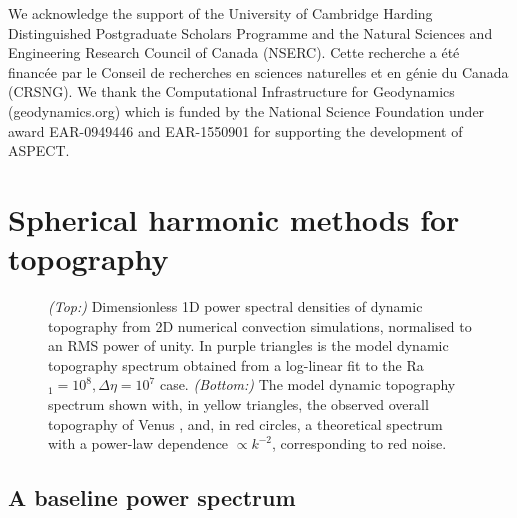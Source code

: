 \documentclass[trackchanges]{aastex63}
\begin{document}
\vspace{2cm}
We acknowledge the support of the University of Cambridge Harding Distinguished Postgraduate Scholars Programme and the Natural Sciences and Engineering Research Council of Canada (NSERC). Cette recherche a \'{e}t\'{e} financ\'{e}e par le Conseil de recherches en sciences naturelles et en g\'{e}nie du Canada (CRSNG). We thank the Computational Infrastructure for Geodynamics (geodynamics.org) which is funded by the National Science Foundation under award EAR-0949446 and EAR-1550901 for supporting the development of ASPECT.


\appendix
\restartappendixnumbering

\section{Spherical harmonic methods for topography}
\label{sec:sph-harms}


\begin{figure}
    \centering
    \caption{\textit{(Top:)} Dimensionless 1D power spectral densities of dynamic topography from 2D numerical convection simulations, normalised to an RMS power of unity. In purple triangles is the model dynamic topography spectrum obtained from a log-linear fit to the Ra$_1 = 10^8, \Delta \eta = 10^7$ case. \textit{(Bottom:)} The model dynamic topography spectrum shown with, in yellow triangles, the observed overall topography of Venus \citep{wieczorek_gravity_2015}, and, in red circles, a theoretical spectrum with a power-law dependence $\propto k^{-2}$, corresponding to red noise.
    \label{fig:top-spectra}}
\end{figure}



\subsection{A baseline power spectrum} \label{sec:spectral-model}
\end{document}
